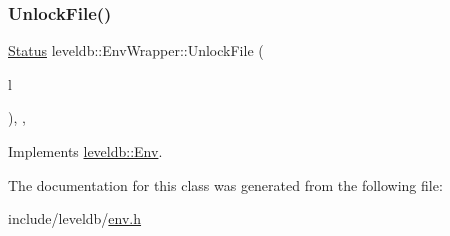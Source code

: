 \subsubsection{\texorpdfstring{UnlockFile()}{UnlockFile()}}
{\footnotesize\ttfamily \mbox{\hyperlink{classleveldb_1_1_status}{Status}} leveldb\+::\+Env\+Wrapper\+::\+Unlock\+File (\begin{DoxyParamCaption}\item[{\mbox{\hyperlink{classleveldb_1_1_file_lock}{File\+Lock}} $\ast$}]{l }\end{DoxyParamCaption})\hspace{0.3cm}{\ttfamily [inline]}, {\ttfamily [override]}, {\ttfamily [virtual]}}



Implements \mbox{\hyperlink{classleveldb_1_1_env_a194a2ee3c21bc0b204ad0e5bc3b81d4b}{leveldb\+::\+Env}}.



The documentation for this class was generated from the following file\+:\begin{DoxyCompactItemize}
\item 
include/leveldb/\mbox{\hyperlink{env_8h}{env.\+h}}\end{DoxyCompactItemize}
